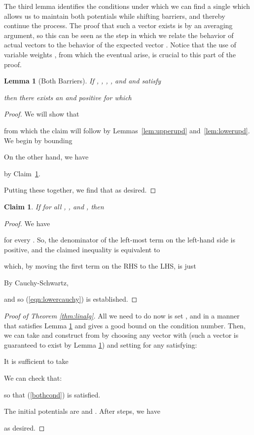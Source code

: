 \documentclass[12pt]{article}
\newtheorem{lemma}[theorem]{Lemma}
\newtheorem{claim}[theorem]{Claim}
\begin{document}
The third lemma identifies the conditions under which we can find a single
   which allows us to maintain both potentials while shifting barriers, and thereby continue the
  process.
The proof that such a vector exists is by an averaging argument, so 
  this can be seen as the step in which we relate the behavior of actual vectors
  to the behavior of the expected vector .
Notice that the use of variable weights , from which the eventual
   arise, is crucial to this part of the proof.
\begin{lemma}[Both Barriers]\label{lem:shiftboth} 
If 
, ,
,
, and  and  satisfy

then there exists an  and positive  for which


 \end{lemma}
\begin{proof}
We will show that

 from which the claim will follow by Lemmas~\ref{lem:upperupd} and~\ref{lem:lowerupd}.
We begin by bounding


On the other hand, we have

by Claim~\ref{clm:lowercauchy}. 

Putting these together, we find that 
 as desired.
\end{proof}

\begin{claim}\label{clm:lowercauchy}
If  for all ,
   ,
  and ,
then


\end{claim}
\begin{proof}
We have 

for every .
So, the denominator of the left-most term on the left-hand side is positive,
 and the claimed inequality is equivalent to

which, by moving the first term on the RHS to the LHS, is just

By Cauchy-Schwartz,

and so (\ref{eqn:lowercauchy}) is established.
\end{proof}




\begin{proof}[Proof of Theorem \ref{thm:linalg}] All we need to do now is set ,
and  in a manner that satisfies Lemma \ref{lem:shiftboth} and gives a good
bound on the condition number. Then, we can take  and 
construct  from  by choosing any vector  with
 (such a vector is guaranteed to exist by Lemma
\ref{lem:shiftboth})
and setting  for any  satisfying:


It is sufficient to take


We can check that:

so that (\ref{bothcond}) is satisfied.

The initial potentials are
 and
. After 
steps, we have

as desired. 
\end{proof}
\end{document}
